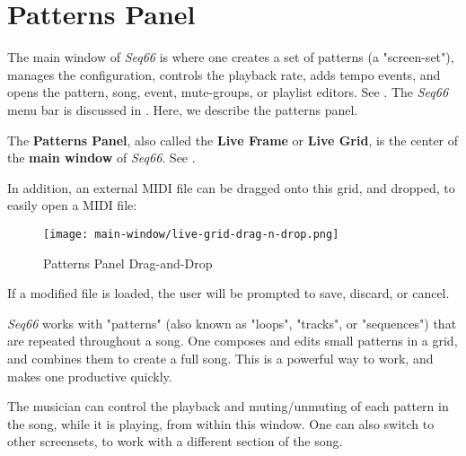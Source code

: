 %
%
%

\section{Patterns Panel}
\label{sec:patterns_panel}

   The main window of \textsl{Seq66} is
   where one creates a set of patterns (a "screen-set"),
   manages the configuration, controls the playback rate, adds tempo events,
   and opens the pattern, song, event, mute-groups, or playlist editors.
   See .
   The \textsl{Seq66} menu bar is discussed in .
   Here, we describe the patterns panel.

   The \textbf{Patterns Panel}, also called the \textbf{Live Frame} or
   \textbf{Live Grid}, is the center of the
   \textbf{main window} of \textsl{Seq66}.
   See .

   In addition, an external MIDI file can be dragged onto this grid,
   and dropped, to easily open a MIDI file:

\begin{figure}[H]
   \centering 
   \texttt{[image: main-window/live-grid-drag-n-drop.png]}
   \caption{Patterns Panel Drag-and-Drop}
   \label{fig:patterns_panel_drag_n_drop}
\end{figure}

   If a modified file is loaded, the user
   will be prompted to save, discard, or cancel.

   \textsl{Seq66} works with "patterns" (also known as "loops", "tracks", or
   "sequences") that are repeated throughout a song.
   One composes and edits small patterns in a grid,
   and combines them to create a full song.
   This is a powerful way to work, and makes one productive quickly.

   The musician can
   control the playback and muting/unmuting of each pattern in
   the song, while it is playing, from within this window.
   One can also switch to other screensets, to work with a different
   section of the song.

